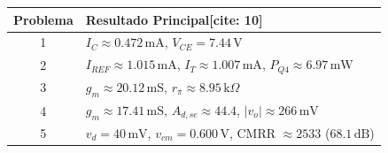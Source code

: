 \documentclass[11pt, a4paper]{article}
\begin{document}
\vspace{0.5cm}
\begin{tcolorbox}[colback=yellow!10, colframe=orange, title=\textbf{Resumen Numérico de Referencia[cite: 10]}]
\centering
\renewcommand{\arraystretch}{1.3}
\begin{tabularx}{0.9\textwidth}{|c|>{\raggedright\arraybackslash}X|}
\hline
\rowcolor{orange!20}
\textbf{Problema} & \textbf{Resultado Principal[cite: 10]} \\ \hline
1 & $I_C \approx 0.472\,\text{mA}$, $V_{CE} = 7.44\,\text{V}$ \\ \hline
2 & $I_{REF} \approx 1.015\,\text{mA}$, $I_T \approx 1.007\,\text{mA}$, $P_{Q4} \approx 6.97\,\text{mW}$ \\ \hline
3 & $g_m \approx 20.12\,\text{mS}$, $r_\pi \approx 8.95\,\text{k}\Omega$ \\ \hline
4 & $g_m \approx 17.41\,\text{mS}$, $A_{d,se} \approx 44.4$, $|v_o| \approx 266\,\text{mV}$ \\ \hline
5 & $v_d = 40\,\text{mV}$, $v_{cm} = 0.600\,\text{V}$, CMRR $\approx 2533$ ($68.1\,\text{dB}$) \\ \hline
\end{tabularx}
\end{tcolorbox}
\end{document}

